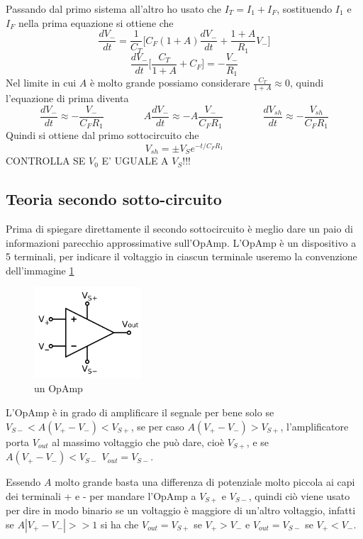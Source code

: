 \documentclass{article}
\begin{document}
			Passando dal primo sistema all'altro ho usato che $I_T=I_1+I_F$, sostituendo $I_1$ e $I_F$ nella prima equazione si ottiene che
			\[
				\frac{dV_-}{dt}=\frac{1}{C_T}\bigg[C_F(1+A)\frac{dV_-}{dt}+\frac{1+A}{R_1}V_-\bigg]
			\]
			\[
				\frac{dV_-}{dt}\bigg[\frac{C_T}{1+A}+C_F\bigg]=-\frac{V_-}{R_1}
			\]
			Nel limite in cui $A$ è molto grande possiamo considerare $\frac{C_T}{1+A}\approx0$, quindi l'equazione di prima diventa
			\[
				\frac{dV_-}{dt}\approx-\frac{V_-}{C_FR_1}\qquad\qquad
				A\frac{dV_-}{dt}\approx-A\frac{V_-}{C_FR_1}\qquad\qquad
				\frac{dV_{sh}}{dt}\approx-\frac{V_{sh}}{C_FR_1}
			\]
			Quindi si ottiene dal primo sottocircuito che\newline
			\begin{equation}
				V_{sh}=\pm V_Se^{-t/C_FR_1}
			\end{equation}
			CONTROLLA SE $V_0$ E' UGUALE A $V_S$!!!
		\subsection{Teoria secondo sotto-circuito}
			Prima di spiegare direttamente il secondo sottocircuito è meglio dare un paio di informazioni parecchio approssimative sull'OpAmp.\newline
			L'OpAmp è un dispositivo a 5 terminali, per indicare il voltaggio in ciascun terminale useremo la convenzione dell'immagine \ref{fig:OpAmp1}\newline
			\begin{figure}
				\label{fig:OpAmp1}
				\centering
				\includegraphics[width=40mm]{immagini/OpAmp1.png}
				\caption{un OpAmp}
			\end{figure}
			L'OpAmp è in grado di amplificare il segnale per bene solo se $V_{S-}<A(V_+-V_-)<V_{S+}$, se per caso $A(V_+-V_-)>V_{S+}$, l'amplificatore porta $V_{out}$ al massimo voltaggio che può dare, cioè $V_{S+}$, e se $A(V_+-V_-)<V_{S-}$ $V_{out}=V_{S-}$.\newline

			Essendo $A$ molto grande basta una differenza di potenziale molto piccola ai capi dei terminali + e - per mandare l'OpAmp a $V_{S+}$ e $V_{S-}$, quindi ciò viene usato per dire in modo binario se un voltaggio è maggiore di un'altro voltaggio, infatti se $A|V_+-V_-|>>1$ si ha che $V_{out}=V_{S+}$ se $V_+>V_-$ e $V_{out}=V_{S-}$ se $V_+<V_-$.\newline
\end{document}
